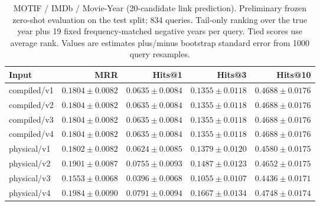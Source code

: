 \begin{table}[t]
\centering
\small
\begin{tabular}{lrrrr}
\toprule
Input & MRR & Hits@1 & Hits@3 & Hits@10 \\
\midrule
compiled/v1 & $0.1804 \pm 0.0082$ & $0.0635 \pm 0.0084$ & $0.1355 \pm 0.0118$ & $0.4688 \pm 0.0176$ \\
compiled/v2 & $0.1804 \pm 0.0082$ & $0.0635 \pm 0.0084$ & $0.1355 \pm 0.0118$ & $0.4688 \pm 0.0176$ \\
compiled/v3 & $0.1804 \pm 0.0082$ & $0.0635 \pm 0.0084$ & $0.1355 \pm 0.0118$ & $0.4688 \pm 0.0176$ \\
compiled/v4 & $0.1804 \pm 0.0082$ & $0.0635 \pm 0.0084$ & $0.1355 \pm 0.0118$ & $0.4688 \pm 0.0176$ \\
physical/v1 & $0.1802 \pm 0.0082$ & $0.0624 \pm 0.0085$ & $0.1379 \pm 0.0120$ & $0.4580 \pm 0.0175$ \\
physical/v2 & $0.1901 \pm 0.0087$ & $0.0755 \pm 0.0093$ & $0.1487 \pm 0.0123$ & $0.4652 \pm 0.0175$ \\
physical/v3 & $0.1553 \pm 0.0068$ & $0.0396 \pm 0.0068$ & $0.1055 \pm 0.0107$ & $0.4436 \pm 0.0171$ \\
physical/v4 & $0.1984 \pm 0.0090$ & $0.0791 \pm 0.0094$ & $0.1667 \pm 0.0134$ & $0.4748 \pm 0.0174$ \\
\bottomrule
\end{tabular}
\caption{MOTIF / IMDb / Movie-Year (20-candidate link prediction). Preliminary frozen zero-shot evaluation on the test split; 834 queries. Tail-only ranking over the true year plus 19 fixed frequency-matched negative years per query. Tied scores use average rank. Values are estimates plus/minus bootstrap standard error from 1000 query resamples.}
\label{tab:motif-movie_year-link_prediction}
\end{table}
